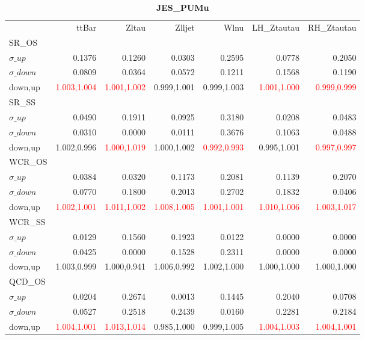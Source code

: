\documentclass[11pt,oneside,a4paper]{article}
\begin{document}
\begin{table}
\centering
\caption{\bf{JES\_PUMu}}
\begin{tabular}{lrrrrrr}
 & ttBar & Zltau & Zlljet & Wlnu & LH\_Ztautau & RH\_Ztautau \\
SR\_OS &  &  &  &  &  &  \\
$\sigma\_up$ & 0.1376 & 0.1260 & 0.0303 & 0.2595 & 0.0778 & 0.2050 \\
$\sigma\_down$ & 0.0809 & 0.0364 & 0.0572 & 0.1211 & 0.1568 & 0.1190 \\
down,up & \textcolor{red}{1.003,1.004} & \textcolor{red}{1.001,1.002} & 0.999,1.001 & 0.999,1.003 & \textcolor{red}{1.001,1.000} & \textcolor{red}{0.999,0.999} \\

\hline
SR\_SS &  &  &  &  &  &  \\
$\sigma\_up$ & 0.0490 & 0.1911 & 0.0925 & 0.3180 & 0.0208 & 0.0483 \\
$\sigma\_down$ & 0.0310 & 0.0000 & 0.0111 & 0.3676 & 0.1063 & 0.0488 \\
down,up & 1.002,0.996 & \textcolor{red}{1.000,1.019} & 1.000,1.002 & \textcolor{red}{0.992,0.993} & 0.995,1.001 & \textcolor{red}{0.997,0.997} \\

\hline
WCR\_OS &  &  &  &  &  &  \\
$\sigma\_up$ & 0.0384 & 0.0320 & 0.1173 & 0.2081 & 0.1139 & 0.2070 \\
$\sigma\_down$ & 0.0770 & 0.1800 & 0.2013 & 0.2702 & 0.1832 & 0.0406 \\
down,up & \textcolor{red}{1.002,1.001} & \textcolor{red}{1.011,1.002} & \textcolor{red}{1.008,1.005} & \textcolor{red}{1.001,1.001} & \textcolor{red}{1.010,1.006} & \textcolor{red}{1.003,1.017} \\

\hline
WCR\_SS &  &  &  &  &  &  \\
$\sigma\_up$ & 0.0129 & 0.1560 & 0.1923 & 0.0122 & 0.0000 & 0.0000 \\
$\sigma\_down$ & 0.0425 & 0.0000 & 0.1528 & 0.2311 & 0.0000 & 0.0000 \\
down,up & 1.003,0.999 & 1.000,0.941 & 1.006,0.992 & 1.002,1.000 & 1.000,1.000 & 1.000,1.000 \\

\hline
QCD\_OS &  &  &  &  &  &  \\
$\sigma\_up$ & 0.0204 & 0.2674 & 0.0013 & 0.1445 & 0.2040 & 0.0708 \\
$\sigma\_down$ & 0.0527 & 0.2518 & 0.2439 & 0.0160 & 0.2281 & 0.2184 \\
down,up & \textcolor{red}{1.004,1.001} & \textcolor{red}{1.013,1.014} & 0.985,1.000 & 0.999,1.005 & \textcolor{red}{1.004,1.003} & \textcolor{red}{1.004,1.001} \\


\end{tabular}
\end{table}
\end{document}
